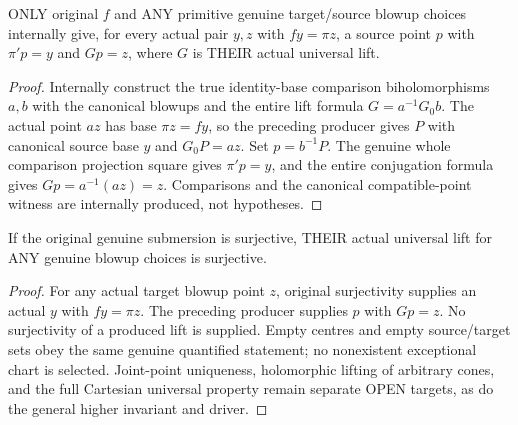 \begin{theorem}
\label{hir:submersion-blowup-compatible-arbitrary-choices}
\leanok
{}
ONLY original $f$ and ANY primitive genuine target/source blowup choices
internally give, for every actual pair $y,z$ with $fy=\pi z$, a source point
$p$ with $\pi'p=y$ and $Gp=z$, where $G$ is THEIR actual universal lift.
\end{theorem}
\begin{proof}
Internally construct the true identity-base comparison biholomorphisms
$a,b$ with the canonical blowups and the entire lift formula $G=a^{-1}G_0b$.
The actual point $az$ has base $\pi z=fy$, so the preceding producer gives
$P$ with canonical source base $y$ and $G_0P=az$. Set $p=b^{-1}P$.
The genuine whole comparison projection square gives $\pi'p=y$, and the
entire conjugation formula gives $Gp=a^{-1}(az)=z$. Comparisons and the
canonical compatible-point witness are internally produced, not hypotheses.
\end{proof}

\begin{theorem}
\label{hir:submersion-blowup-compatible-surjective-lift}
\leanok
{}
If the original genuine submersion is surjective, THEIR actual universal
lift for ANY genuine blowup choices is surjective.
\end{theorem}
\begin{proof}
For any actual target blowup point $z$, original surjectivity supplies an
actual $y$ with $fy=\pi z$. The preceding producer supplies $p$ with $Gp=z$.
No surjectivity of a produced lift is supplied. Empty centres and empty
source/target sets obey the same genuine quantified statement; no nonexistent
exceptional chart is selected. Joint-point uniqueness, holomorphic lifting
of arbitrary cones, and the full Cartesian universal property remain
separate OPEN targets, as do the general higher invariant and driver.
\end{proof}
